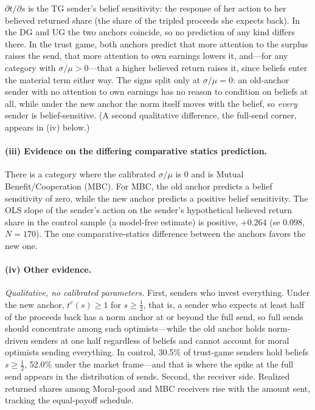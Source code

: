 \documentclass[11pt]{article}
\begin{document}
$\partial t/\partial s$ is the TG sender's belief sensitivity: the response of her action to her believed returned share (the share of the tripled proceeds she expects back). In the DG and UG the two anchors coincide, so no prediction of any kind differs there. In the trust game, both anchors predict that more attention to the surplus raises the send, that more attention to own earnings lowers it, and---for any category with
$\sigma/\mu>0$---that a higher believed return raises it, since beliefs enter the
material term either way. The signs split only at $\sigma/\mu=0$: an old-anchor sender
with no attention to own earnings has no reason to condition on beliefs at all, while
under the new anchor the norm itself moves with the belief, so \emph{every} sender is
belief-sensitive. (A second qualitative difference, the full-send corner, appears in
(iv) below.)

\paragraph{(iii) Evidence on the differing comparative statics prediction.} There is a category where the calibrated $\sigma/\mu$ is 0 and is Mutual Benefit/Cooperation (MBC). For MBC, the old anchor predicts a
belief sensitivity of zero, while the new anchor predicts a positive belief sensitivity. The OLS
slope of the sender's action on the sender's hypothetical believed return share in the control sample (a model-free estimate) is positive, $+0.264$ (se $0.098$, $N=170$). The one comparative-statics difference between the anchors favors the new one.%

\paragraph{(iv) Other evidence.} 

\emph{Qualitative, no calibrated parameters.} First, senders who invest everything. Under the new anchor,
$t^{e}(s)\ge1$ for $s\ge\tfrac12$, that is, a sender
who expects at least half of the proceeds back has a norm anchor at or beyond the full
send, so full sends should concentrate among such optimists---while the old anchor
holds norm-driven senders at one half regardless of beliefs and cannot account for
moral optimists sending everything. In control, 30.5\% of trust-game senders hold
beliefs $s\ge\tfrac12$, 52.0\% under the market frame---and that is where the spike at
the full send appears in the distribution of sends. Second, the receiver side.
Realized returned shares among Moral-good and MBC receivers rise with the amount sent,
tracking the equal-payoff schedule.
\end{document}
